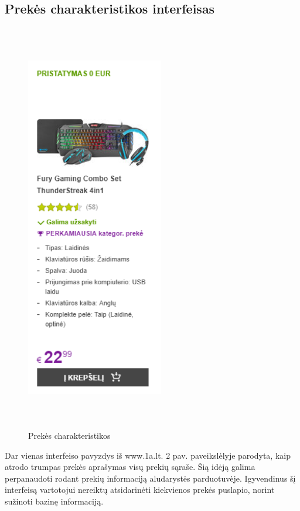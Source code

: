 \documentclass[oneside]{VUMIFPSkursinis}
\begin{document}
	\subsection{Prekės charakteristikos interfeisas}
		\begin{figure}[h]
			\centering
			\includegraphics[width=6cm,height=18cm,keepaspectratio]{IkvepiantisInterfeisas2.png}
			\caption{ Prekės charakteristikos}
		\end{figure}
		 Dar vienas interfeiso pavyzdys iš www.1a.lt. 2 pav.
		 paveikslėlyje parodyta, kaip atrodo trumpas prekės aprašymas visų prekių sąraše.
		 Šią idėją galima perpanaudoti rodant prekių informaciją aludarystės parduotuvėje.
		 Igyvendinus šį interfeisą vartotojui nereiktų atsidarinėti kiekvienos prekės puslapio, norint sužinoti bazinę informaciją.
		\pagebreak
\end{document}
